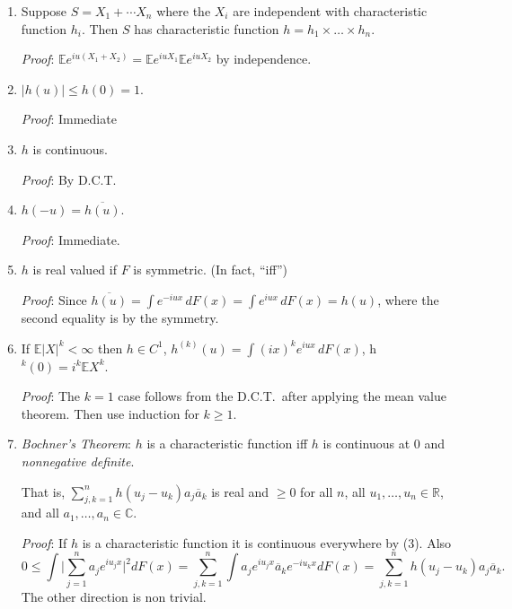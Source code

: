 \documentclass[a4paper]{amsart}
\theoremstyle{plain}
\theoremstyle{definition}
\theoremstyle{remark}
\begin{document}
\begin{enumerate} 

\item Suppose $ S = X_1 +\cdots X_n $ where the $ X_i $ are independent with characteristic function $ h_i $. Then $ S $ has characteristic function $ h = h_1 \times \dots \times h_n $.

 \emph{Proof}: $ \mathbb{E} e^{iu(X_1 + X_2)} = \mathbb{E} e^{iu X_1   }   \mathbb{E} e^{iu  X_2 } $ by independence.

\item $  |h(u)| \leq h(0) = 1 $.

\emph{Proof}: Immediate 

\item $ h $ is continuous.

\emph{Proof}: By D.C.T. 

\item $ h(-u) = \overline{h(u)} $.

\emph{Proof}: Immediate.


\item $ h $ is real valued if $ F $ is symmetric. (In fact, ``iff'')

\emph{Proof}: Since $ \overline{h(u)} = \int e^{-iux}\, dF(x) = \int e^{ iux}\, dF(x) = h(u) $, where the second equality is by the symmetry. 

\item If $ \mathbb{E} |X|^k < \infty $ then $ h \in C^1 $, $ h^{(k)}(u) = \int (ix)^k e^{iux}\, dF(x) $,
h$ ^k(0) = i^k \mathbb{E} X^k$.

\emph{Proof}: The $ k=1 $ case follows from the D.C.T.\ after applying the mean value theorem.  Then use induction for $ k \geq 1 $. 

\item \emph{Bochner's Theorem}: $ h $ is a characteristic function iff $ h $ is continuous at $ 0 $ and   \emph{nonnegative definite}.  

That is,
$ \sum_{j,k=1}^n h(u_j-u_k) a_j \overline{a}_k $ is real and $ \geq 0 $ for all $ n $, all $ u_1,\dots, u_n \in \mathbb{R} $, and all $ a_1,\dots, a_n \in \mathbb{C} $.  

\emph{Proof}:   If $ h $ is a characteristic function it is continuous everywhere by (3).  Also
\[
0 \leq \int \bigg| \sum_{j=1}^n a_j e^{iu_j x} \bigg|^2 dF(x)= \sum_{j,k=1}^n \int a_j e^{iu_j x} \overline{a}_k e^{-iu_k x} dF(x)= 
                   \sum_{j,k=1}^n h(u_j-u_k) a_j \overline{a}_k.
                   \]
The other direction is non trivial.


\end{enumerate} 
\end{document}
